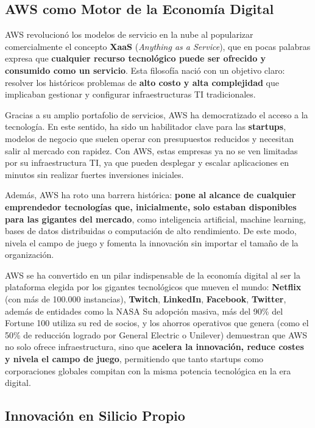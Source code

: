 \documentclass[12pt,a4paper]{article}
\begin{document}
\subsection{AWS como Motor de la Economía Digital}

AWS revolucionó los modelos de servicio en la nube al popularizar comercialmente el concepto \textbf{XaaS} (\textit{Anything as a Service}), que en pocas palabras expresa que \textbf{cualquier recurso tecnológico puede ser ofrecido y consumido como un servicio}. Esta filosofía nació con un objetivo claro: resolver los históricos problemas de \textbf{alto costo y alta complejidad} que implicaban gestionar y configurar infraestructuras TI tradicionales.

Gracias a su amplio portafolio de servicios, AWS ha democratizado el acceso a la tecnología. En este sentido, ha sido un habilitador clave para las \textbf{startups}, modelos de negocio que suelen operar con presupuestos reducidos y necesitan salir al mercado con rapidez. Con AWS, estas empresas ya no se ven limitadas por su infraestructura TI, ya que pueden desplegar y escalar aplicaciones en minutos sin realizar fuertes inversiones iniciales.

Además, AWS ha roto una barrera histórica: \textbf{pone al alcance de cualquier emprendedor tecnologías que, inicialmente, solo estaban disponibles para las gigantes del mercado}, como inteligencia artificial, machine learning, bases de datos distribuidas o computación de alto rendimiento. De este modo, nivela el campo de juego y fomenta la innovación sin importar el tamaño de la organización.

AWS se ha convertido en un pilar indispensable de la economía digital al ser la plataforma elegida por los gigantes tecnológicos que mueven el mundo: \textbf{Netflix} (con más de 100.000 instancias), \textbf{Twitch}, \textbf{LinkedIn}, \textbf{Facebook}, \textbf{Twitter}, además de entidades como la NASA Su adopción masiva, más del 90\% del Fortune 100 utiliza su red de socios, y los ahorros operativos que genera (como el 50\% de reducción logrado por General Electric o Unilever) demuestran que AWS no solo ofrece infraestructura, sino que \textbf{acelera la innovación, reduce costes y nivela el campo de juego}, permitiendo que tanto startups como corporaciones globales compitan con la misma potencia tecnológica en la era digital.

\subsection{Innovación en Silicio Propio}
\end{document}

